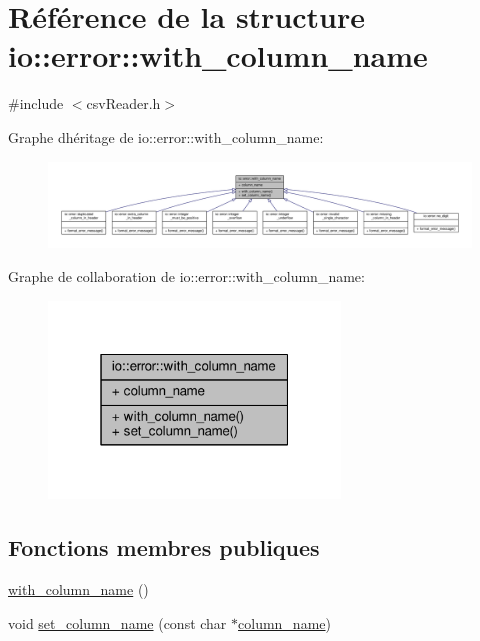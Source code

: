 \hypertarget{structio_1_1error_1_1with__column__name}{}\section{Référence de la structure io\+:\+:error\+:\+:with\+\_\+column\+\_\+name}
\label{structio_1_1error_1_1with__column__name}


{\ttfamily \#include $<$csv\+Reader.\+h$>$}



Graphe d\textquotesingle{}héritage de io\+:\+:error\+:\+:with\+\_\+column\+\_\+name\+:
\nopagebreak
\begin{figure}[H]
\begin{center}
\leavevmode
\includegraphics[width=350pt]{structio_1_1error_1_1with__column__name__inherit__graph}
\end{center}
\end{figure}


Graphe de collaboration de io\+:\+:error\+:\+:with\+\_\+column\+\_\+name\+:
\nopagebreak
\begin{figure}[H]
\begin{center}
\leavevmode
\includegraphics[width=220pt]{structio_1_1error_1_1with__column__name__coll__graph}
\end{center}
\end{figure}
\subsection*{Fonctions membres publiques}
\begin{DoxyCompactItemize}
\item 
\hyperlink{structio_1_1error_1_1with__column__name_a07d04d38dc87e6b20d2371695a3229c7}{with\+\_\+column\+\_\+name} ()
\item 
void \hyperlink{structio_1_1error_1_1with__column__name_a2a8144d3591a4bb618368ca7261befef}{set\+\_\+column\+\_\+name} (const char $\ast$\hyperlink{structio_1_1error_1_1with__column__name_af40ba00f1f035d363b099baf1f724323}{column\+\_\+name})
\end{DoxyCompactItemize}
